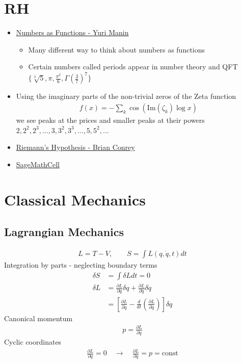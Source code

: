 \documentclass[10pt,a4paper]{book}
\theoremstyle{definition}
\begin{document}
\section{RH}
\begin{itemize}
\item  \href{https://arxiv.org/pdf/1312.5160.pdf}{Numbers as Functions - Yuri Manin}
\begin{itemize}
\item Many different way to think about numbers as functions
\item Certain numbers called periods appear in number  theory and QFT $\{\sqrt[3]{5},\pi,\frac{\pi^2}{6},\Gamma\left(\frac{3}{7}\right)^7\}$
\end{itemize}

\item Using the imaginary parts of the non-trivial zeros of the Zeta function
\begin{align}
f(x)=-\sum_{k}\cos(\text{Im}(\zeta_k)\log x)
\end{align}
we see peaks at the prices and smaller peaks at their powers ${2,2^2,2^3,...,3,3^2,3^3,...,5,5^2,...}$

\item \href{https://tinyurl.com/conrey90}{Riemann's Hypothesis - Brian Conrey}

\item \href{https://sagecell.sagemath.org/}{SageMathCell}
\end{itemize}


\section{Classical Mechanics}

\subsection{Lagrangian Mechanics}
\begin{align}
L=T-V,\qquad S=\int L(q,\dot{q},t) dt
\end{align}
Integration by parts - neglecting boundary terms
\begin{align}
\delta S&=\int \delta L dt=0\\
\delta L&=\frac{\partial L}{\partial q}\delta q+\frac{\partial L}{\partial \dot{q}}\delta \dot{q}\\
&=\left[\frac{\partial L}{\partial q}-\frac{d}{dt}\left(\frac{\partial L}{\partial \dot{q}}\right)\right]\delta q
\end{align}
Canonical momentum
\begin{align}
p=\frac{\partial L}{\partial \dot{q}}
\end{align}
Cyclic coordinates
\begin{align}
\frac{\partial L}{\partial q}=0\quad\rightarrow\quad\frac{\partial L}{\partial \dot{q}}=p=\text{const}
\end{align}
\end{document}
